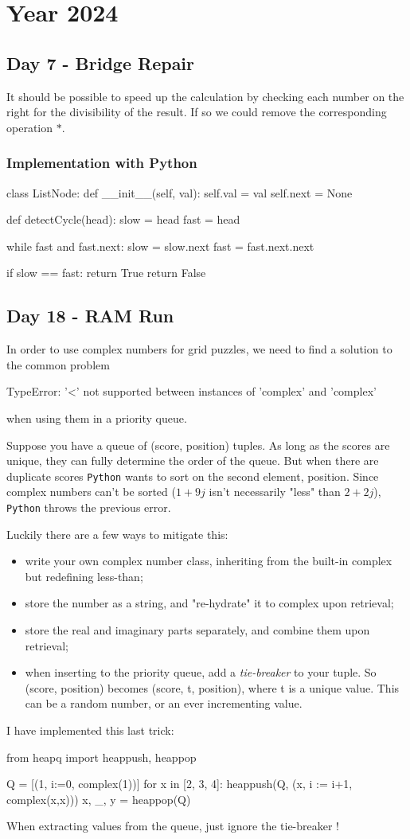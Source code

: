 \documentclass[]{scrartcl}
\begin{document}
\section{Year 2024}

\subsection{Day 7 - Bridge Repair}
It should be possible to speed up the calculation by checking each number on the right for the divisibility of the result. If so we could remove the corresponding operation $*$.

\subsubsection {Implementation with Python}
\begin{ipython}
	class ListNode:
	def __init__(self, val):
	self.val = val
	self.next = None
	
	def detectCycle(head):
	slow = head
	fast = head
	
	while fast and fast.next:
	slow = slow.next
	fast = fast.next.next
	
	if slow == fast:
	return True  
	return False
\end{ipython}

\subsection{Day 18 - RAM Run}

In order to use complex numbers for grid puzzles, we need to find a solution to the common problem
\begin{ipython}
TypeError: '<' not supported between instances of 'complex' and 'complex'
\end{ipython}
when using them in a priority queue.

Suppose you have a queue of (score, position) tuples. As long as the scores are unique, they can fully determine the order of the queue. But when there are duplicate scores \texttt{Python} wants to sort on the second element, position. Since complex numbers can't be sorted ($1+9j$ isn't necessarily "less" than $2+2j$), \texttt{Python} throws the previous error.

Luckily there are a few ways to mitigate this:
\begin{itemize}
\item write your own complex number class, inheriting from the built-in complex but redefining less-than;
\item store the number as a string, and "re-hydrate" it to complex upon retrieval;
\item store the real and imaginary parts separately, and combine them upon retrieval;
\item when inserting to the priority queue, add a \emph{tie-breaker} to your tuple. So (score, position) becomes (score, t, position), where t is a unique value. This can be a random number, or an ever incrementing value.
\end{itemize}

I have implemented this last trick:
\begin{ipython}
from heapq import heappush, heappop

Q = [(1, i:=0, complex(1))]
for x in [2, 3, 4]:
    heappush(Q, (x, i := i+1, complex(x,x)))
x, _, y = heappop(Q)
\end{ipython}
When extracting values from the queue, just ignore the tie-breaker !
\end{document}
